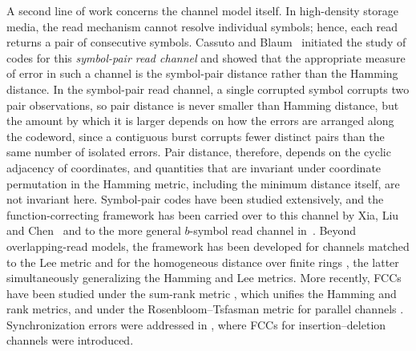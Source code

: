 \documentclass[11pt,draftclsnofoot,journal,onecolumn]{IEEEtran}
\begin{document}
    A second line of work concerns the channel model itself. In high-density storage media, the read mechanism cannot resolve individual symbols; hence, each read returns a pair of consecutive symbols. Cassuto and Blaum~\cite{cassuto2011codes} initiated the study of codes for this \emph{symbol-pair read channel} and showed that the appropriate measure of error in such a channel is the symbol-pair distance rather than the Hamming distance. In the symbol-pair read channel, a single corrupted symbol corrupts two pair observations, so pair distance is never smaller than Hamming distance, but the amount by which it is larger depends on how the errors are arranged along the codeword, since a contiguous burst corrupts fewer distinct pairs than the same number of isolated errors. Pair distance, therefore, depends on the cyclic adjacency of coordinates, and quantities that are invariant under coordinate permutation in the Hamming metric, including the minimum distance itself, are not invariant here. Symbol-pair codes have been studied extensively, and the function-correcting framework has been carried over to this channel by Xia, Liu and Chen~\cite{xia2024function} and to the more general $b$-symbol read channel in~\cite{singh2025,sampath2025}. Beyond overlapping-read models, the framework has been developed for channels matched to the Lee metric \cite{verma2025function,11538231} and for the homogeneous distance over finite rings \cite{liu2026function}, the latter simultaneously generalizing the Hamming and Lee metrics. More recently, FCCs have been studied under the sum-rank metric \cite{kammila2026sumrankmetric}, which unifies the Hamming and rank metrics, and under the Rosenbloom–Tsfasman metric for parallel channels \cite{liu2026RT}. Synchronization errors were addressed in \cite{singh2026insdel}, where FCCs for insertion–deletion channels were introduced.
\end{document}
